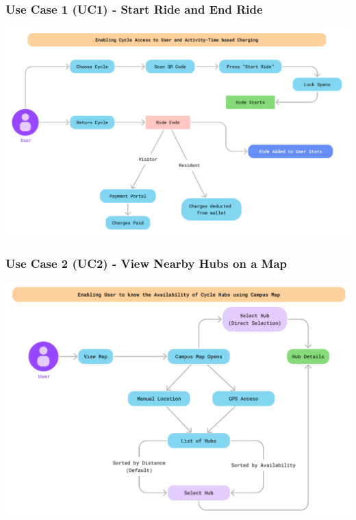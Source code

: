 \documentclass[11pt]{article}
\begin{document}
\subsubsection{Use Case 1 (UC1) - Start Ride and End Ride}
\begin{center}
  \includegraphics[scale=0.5]{../srs/usecase-1.png}
\end{center}

\subsubsection{Use Case 2 (UC2) - View Nearby Hubs on a Map}
\begin{center}
  \includegraphics[scale=0.5]{../srs/usecase-2.png}
\end{center}
\end{document}
